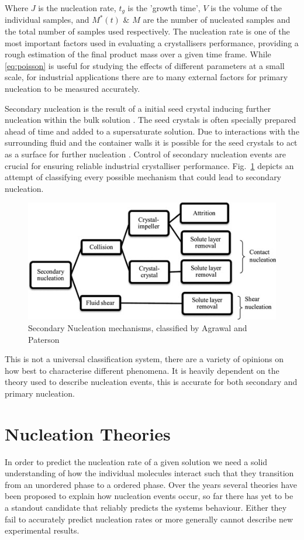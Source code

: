 Where $J$ is the nucleation rate, $t_g$ is the 'growth time', 
$V$ is the volume of the individual samples, and $M^*(t)$ \& 
$M$ are the number of nucleated samples and the total number 
of samples used respectively. The nucleation rate is one of 
the most important factors used in evaluating a crystallisers 
performance, providing a rough estimation of the final product 
mass over a given time frame. While \eqref{eq:poisson} is useful 
for studying the effects of different parameters at a small scale, 
for industrial applications there are to many external factors 
for primary nucleation to be measured accurately. 

Secondary nucleation is the result of a initial seed crystal 
inducing further nucleation within the bulk solution 
\cite{Botsaris1976}. The seed crystals is often specially 
prepared ahead of time and added to a supersaturate solution. 
Due to interactions with the surrounding fluid and the container 
walls it is possible for the seed crystals to act as a surface
for further nucleation \cite{Anwar2015}. Control of secondary 
nucleation events are crucial for ensuring reliable industrial 
crystalliser performance. Fig.~\ref{fig:secondary} depicts an 
attempt of classifying every possible mechanism that could lead 
to secondary nucleation.
\begin{figure}[h!]
	\centering
	\includegraphics[width=0.95\linewidth]{secondary_nucleation.jpg}
	\caption{Secondary Nucleation mechanisms, classified by
		Agrawal and Paterson \cite{Agrawal2015}}
	\label{fig:secondary}
\end{figure}

This is not a universal classification system, there are a 
variety of opinions on how best to characterise different 
phenomena. It is heavily dependent on the theory used to 
describe nucleation events, this is accurate for both 
secondary and primary nucleation.

\section{Nucleation Theories}
In order to predict the nucleation rate of a given solution
we need a solid understanding of how the individual molecules
interact such that they transition from an unordered phase to
a ordered phase. Over the years several theories have been 
proposed to explain how nucleation events occur, so far there
has yet to be a standout candidate that reliably predicts 
the systems behaviour. Either they fail to accurately predict
nucleation rates or more generally cannot describe new 
experimental results.

